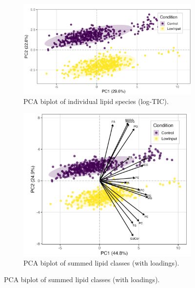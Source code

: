 \documentclass[10pt,letterpaper]{article}
\begin{document}
\begin{figure}[htp]
  \begin{subfigure}[t]{0.48\textwidth}
    \centering
    \includegraphics[width=\textwidth]{fig/main/Fig1c_individual_indv_lipid_PCA_plot.png}
    \caption{PCA biplot of individual lipid species (log‐TIC).}
    \label{fig:1C_species_pca}
  \end{subfigure}
  \hfill
  \begin{subfigure}[t]{0.48\textwidth}
    \centering
    \includegraphics[width=\textwidth]{fig/main/Fig1d_summed_lipid_PCA_biplot.png}
    \caption{PCA biplot of summed lipid classes (with loadings).}
    \label{fig:1D_class_pca}
  \end{subfigure}


\end{figure}
\end{document}
